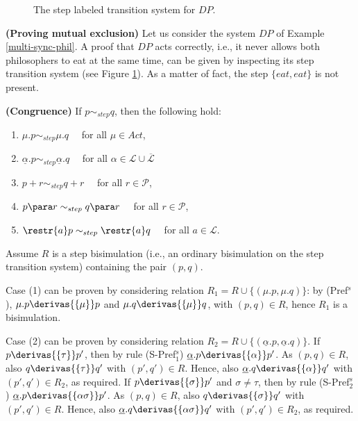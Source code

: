 \begin{figure}
\centering
%
\caption{The step labeled transition system for $DP$. 
}
\label{stepdining}
\end{figure}

\begin{example} {\bf (Proving mutual exclusion)} Let us consider the system $DP$ of Example \ref{multi-sync-phil}. 
A proof that $DP$ acts correctly, i.e., it never allows both philosophers to eat at the same time, can be given by
inspecting its step transition system (see Figure \ref{stepdining}). As a matter of fact, the step $\{eat, eat\}$ is not present.
\fine
\end{example}

\begin{theorem}\label{cong-step}{\bf (Congruence)}
If $p \sim_{step} q$, then the following hold:
\begin{enumerate}
\item  $\mu.p \sim_{step} \mu.q \quad$ for all $\mu \in Act$,
\item $\underline{\alpha}.p \sim_{step} \underline{\alpha}.q \quad$ for all $\alpha \in \mathcal{L}\cup\overline{\mathcal{L}}$
\item $p + r \sim_{step} q + r \quad $ for all  $r \in \mathcal{P}$,
\item $p \para r \sim_{step} q \para r \quad  $ for all  $r \in \mathcal{P}$,
\item $\restr{a}p \sim_{step} \restr{a}q \quad$ for all $a \in \mathcal{L}$.
\end{enumerate}

\proof
Assume $R$ is a step bisimulation (i.e., an ordinary bisimulation on the step transition system)
containing the pair $(p, q)$.

Case (1) can be proven by considering relation $R_1 = R \cup \{(\mu.p, \mu.q)\}$: by (Pref$^s$), 
$\mu.p \derivas{\{\mu\}} p$ and $\mu.q \derivas{\{\mu\}} q$, with $(p, q) \in R$, hence $R_1$ is a bisimulation.

Case (2) can be proven by considering relation $R_2 = R \cup \{(\underline\alpha.p, \underline\alpha.q)\}$. 
If $p \derivas{\{\tau\}} p'$, then by rule (S-Pref$_1^s$) $\underline\alpha.p \derivas{\{\alpha\}} p'$.
As $(p, q) \in R$, also $q \derivas{\{\tau\}} q'$ with $(p', q') \in R$. Hence, also $\underline\alpha.q \derivas{\{\alpha\}} q'$
with $(p', q') \in R_2$, as required. If $p \derivas{\{\sigma\}} p'$ and $\sigma \neq \tau$, then by rule (S-Pref$_2^s$) 
$\underline\alpha.p \derivas{\{\alpha\sigma\}} p'$. As $(p, q) \in R$, also $q \derivas{\{\sigma\}} q'$ with $(p', q') \in R$.
Hence, also $\underline\alpha.q \derivas{\{\alpha\sigma\}} q'$ with $(p', q') \in R_2$, as required. 


\end{theorem}
